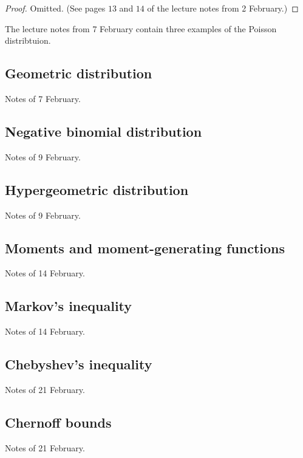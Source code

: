 \documentclass[11pt]{article}
\theoremstyle{definition}
\theoremstyle{remark}
\begin{document}
\begin{proof}
    Omitted. (See pages $13$ and $14$ of the lecture notes from 2 February.)
\end{proof}

The lecture notes from 7 February contain three examples of the Poisson
distribtuion.

\subsection{Geometric distribution}

Notes of 7 February.

\subsection{Negative binomial distribution}

Notes of 9 February.

\subsection{Hypergeometric distribution}

Notes of 9 February.

\subsection{Moments and moment-generating functions}

Notes of 14 February.

\subsection{Markov's inequality}

Notes of 14 February.

\subsection{Chebyshev's inequality}

Notes of 21 February.

\subsection{Chernoff bounds}

Notes of 21 February.
\end{document}
